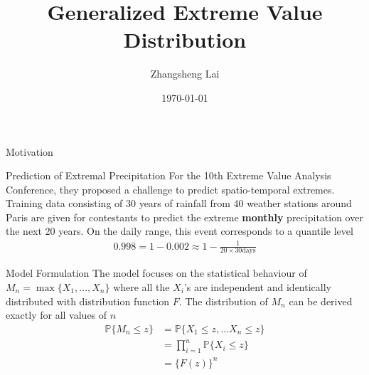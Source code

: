 \documentclass[10pt]{beamer}
\title{Generalized Extreme Value Distribution}
\subtitle{}
\author{Zhangsheng Lai}
\date{\today}
\begin{document}
\begin{frame}
\titlepage
\end{frame}



\begin{frame}{Motivation}
\begin{alertblock}{Prediction of Extremal Precipitation}
For the 10th Extreme Value Analysis Conference, they proposed a challenge to predict spatio-temporal extremes. Training data consisting of 30 years of rainfall from 40 weather stations around Paris are given for contestants to predict the extreme \textbf{monthly} precipitation over the next 20 years. On the daily range, this event corresponds to a quantile level 
\begin{align*}
0.998 = 1 - 0.002 \approx 1- \frac{1}{20 \times 30 \text{days}}
\end{align*}
\end{alertblock}
\end{frame}

\begin{frame}{Model Formulation}
The model focuses on the statistical behaviour of $M_n = \max\{X_1,\ldots,X_n\}$ where all the $X_i$'s are independent and identically distributed with distribution function $F$. The distribution of $M_n$ can be derived exactly for all values of $n$
\begin{align}
\mathbb{P}\{M_n\leq z\} &= \mathbb{P}\{X_1\leq z , \ldots X_n \leq z\}\nonumber\\
&= \prod_{i=1}^{n}\mathbb{P}\{X_i\leq z\}\nonumber\\
&=\{F(z)\}^n \label{eq:maxofrv}
\end{align}
\end{frame}


%
\end{document}
